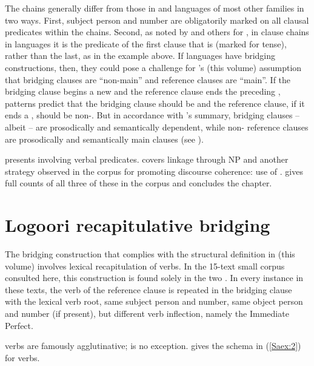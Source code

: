 \documentclass[output=paper]{LSP/langsci}
\begin{document}
The  chains generally differ from those in  and  languages of most other families in two ways. First, subject person and number are obligatorily marked on all clausal predicates within the  chains. Second, as noted by \citet{Haspelmath.1995} and others for , in clause chains in  languages it is the predicate of the first clause that is  (marked for tense), rather than the last, as in the  example above. If  languages have bridging constructions, then, they could pose a challenge for \citeauthor{guerin18}’s (this volume) assumption that bridging clauses are ``non-main'' and reference clauses are ``main''. If the bridging clause begins a new  and the reference clause ends the preceding ,  patterns predict that the bridging clause should be  and the reference clause, if it ends a , should be non-. But in accordance with \citeauthor{guerin18}’s summary,  bridging clauses -- albeit  -- are prosodically and semantically dependent, while non- reference clauses are prosodically and semantically main clauses (see ). 

 presents   involving verbal predicates.  covers linkage through NP  and another strategy observed in the corpus for promoting discourse coherence: use of .  gives full counts of all three of these in the corpus and concludes the chapter.

\section{Logoori recapitulative bridging}
\label{Sarecap.bridg}
The  bridging construction that complies with the structural definition in \citeauthor{guerin18} (this volume) involves lexical recapitulation of verbs. In the 15-text small corpus consulted here, this construction is found solely in the two . In every instance in these texts, the verb of the reference clause is repeated in the bridging clause with the lexical verb root, same subject person and number, same object person and number (if present), but different verb inflection, namely the Immediate Perfect. 

 verbs are famously agglutinative;  is no exception. \citet[][90]{Nurse2003} gives the schema in (\ref{Saex:2}) for  verbs.
\end{document}
